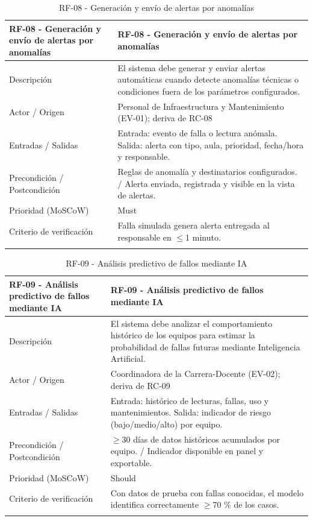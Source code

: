 \begingroup
\small
\begin{longtable}{|p{7.8cm}|p{7.8cm}|}
\hline
RF-08 - Generación y envío de alertas por anomalías & RF-08 - Generación y envío de alertas por anomalías \\ \hline
Descripción & El sistema debe generar y enviar alertas automáticas cuando detecte anomalías técnicas o condiciones fuera de los parámetros configurados. \\ \hline
Actor / Origen & Personal de Infraestructura y Mantenimiento (EV-01); deriva de RC-08 \\ \hline
Entradas / Salidas & Entrada: evento de falla o lectura anómala. Salida: alerta con tipo, aula, prioridad, fecha/hora y responsable. \\ \hline
Precondición / Postcondición & Reglas de anomalía y destinatarios configurados. / Alerta enviada, registrada y visible en la vista de alertas. \\ \hline
Prioridad (MoSCoW) & Must \\ \hline
Criterio de verificación & Falla simulada genera alerta entregada al responsable en $\leq$1 minuto. \\ \hline
\caption{RF-08 - Generación y envío de alertas por anomalías}
\end{longtable}
\endgroup

\begingroup
\small
\begin{longtable}{|p{7.8cm}|p{7.8cm}|}
\hline
RF-09 - Análisis predictivo de fallos mediante IA & RF-09 - Análisis predictivo de fallos mediante IA \\ \hline
Descripción & El sistema debe analizar el comportamiento histórico de los equipos para estimar la probabilidad de fallas futuras mediante Inteligencia Artificial. \\ \hline
Actor / Origen & Coordinadora de la Carrera-Docente (EV-02); deriva de RC-09 \\ \hline
Entradas / Salidas & Entrada: histórico de lecturas, fallas, uso y mantenimientos. Salida: indicador de riesgo (bajo/medio/alto) por equipo. \\ \hline
Precondición / Postcondición & $\geq$30 días de datos históricos acumulados por equipo. / Indicador disponible en panel y exportable. \\ \hline
Prioridad (MoSCoW) & Should \\ \hline
Criterio de verificación & Con datos de prueba con fallas conocidas, el modelo identifica correctamente $\geq$70 \% de los casos. \\ \hline
\caption{RF-09 - Análisis predictivo de fallos mediante IA}
\end{longtable}
\endgroup

